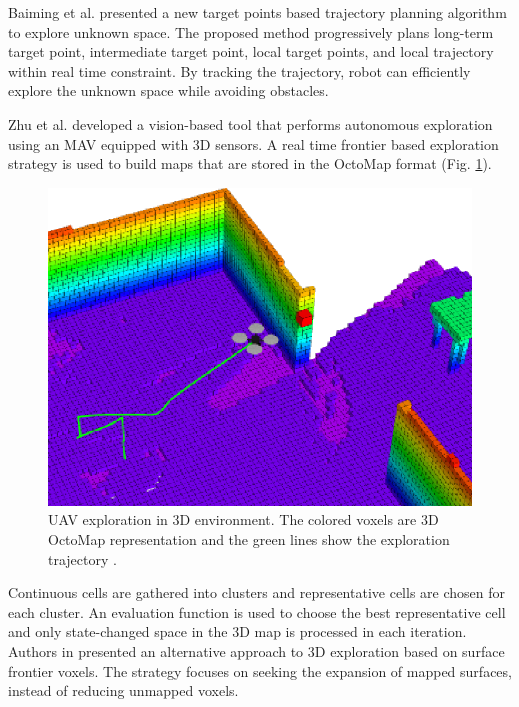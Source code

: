 Baiming et al. \cite{Baiming2018} presented a new target points based trajectory planning algorithm to explore unknown space. The proposed method progressively plans long-term target point, intermediate target point, local target points, and local trajectory within real time constraint. By tracking the trajectory, robot can efficiently explore the unknown space while avoiding obstacles.

Zhu et al. \cite{Zhu2015} developed a vision-based tool that performs autonomous exploration using an MAV equipped with 3D sensors. A real time frontier based exploration strategy is used to build maps that are stored in the OctoMap format (Fig. \ref{fig:octomap}).

\begin{figure}[t!]
	\centering
	\includegraphics[width=1.0\columnwidth]{./pictures/octomap_and_drone.png}	
	\caption{UAV exploration in 3D environment. The colored voxels are 3D OctoMap representation and the green lines show the exploration trajectory \cite{Wang2019}.}
	\label{fig:octomap}
\end{figure}

Continuous cells are gathered into clusters and representative cells are chosen for each cluster. An evaluation function is used to choose the best representative cell and only state-changed space in the 3D map is processed in each iteration.
Authors in \cite{Senarathne2016} presented an alternative approach to 3D
exploration based on surface frontier voxels. The strategy focuses on seeking the expansion of mapped surfaces, instead of reducing unmapped voxels. 

